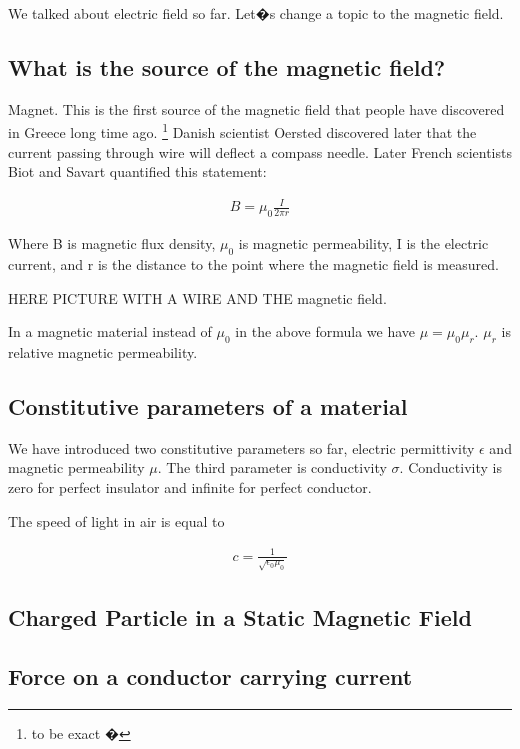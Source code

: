 We talked about electric field so far. Let�s change a topic to the magnetic field.

\subsection{What is the source of the magnetic field?}

Magnet. This is the first source of the magnetic field that people have discovered in Greece long time ago. \footnote{to be exact �} Danish scientist Oersted discovered later that the current passing through wire will deflect a compass needle. Later French scientists Biot and Savart quantified this statement:

\begin{eqnarray}
B = \mu_0 \frac{I}{2 \pi r}
\end{eqnarray}

Where B is magnetic flux density, $\mu_0$ is magnetic permeability, I is the electric current, and r is the distance to the point where the magnetic field is measured.

HERE PICTURE WITH A WIRE AND THE magnetic field.



In a magnetic material instead of $\mu_0$ in the above formula we have $\mu=\mu_0 \mu_r$. $\mu_r$ is relative magnetic permeability.

\subsection{Constitutive parameters of a material}

We have introduced two constitutive parameters so far, electric permittivity $\epsilon$ and magnetic permeability $\mu$. The third parameter is conductivity $\sigma$. Conductivity is zero for perfect insulator and infinite for perfect conductor. 

The speed of light in air is equal to 

\begin{eqnarray}
c=\frac{1}{\sqrt{\epsilon_0 \mu_0}}
\end{eqnarray}  

 
\subsection{Charged Particle in a Static Magnetic Field}



\subsection{Force on a conductor carrying current}


